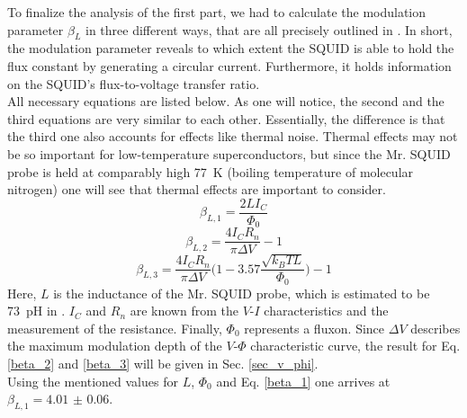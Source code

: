 \documentclass[a4paper,10pt]{article}
\begin{document}
To finalize the analysis of the first part, we had to calculate the modulation parameter $\beta_L$ in three different ways, that are all precisely outlined in \cite{skriptum}. In short, the modulation parameter reveals to which extent the SQUID is able to hold the flux constant by generating a circular current. Furthermore, it holds information on the SQUID's flux-to-voltage transfer ratio. 
\\
All necessary equations are listed below. As one will notice, the second and the third equations are very similar to each other. Essentially, the difference is that the third one also accounts for effects like thermal noise. Thermal effects may not be so important for low-temperature superconductors, but since the Mr. SQUID probe is held at comparably high \SI{77}{\kelvin} (boiling temperature of molecular nitrogen) one will see that thermal effects are important to consider. 
\begin{equation}
    \label{beta_1}
    \beta_{L,1} = \frac{2 L I_C}{\Phi_0}
\end{equation}
\begin{equation}
    \label{beta_2}
    \beta_{L,2} = \frac{4 I_C R_n}{\pi \Delta V} - 1
\end{equation}
\begin{equation}
    \label{beta_3}
    \beta_{L,3} = \frac{4 I_C R_n}{\pi \Delta V} \big( 1 - 3.57  \frac{\sqrt{k_B T L}}{\Phi_0} \big) - 1
\end{equation}
Here, $L$ is the inductance of the Mr. SQUID probe, which is estimated to be \SI{73}{\pico \henry} in \cite{skriptum}. $I_C$ and $R_n$ are known from the $V$-$I$ characteristics and the measurement of the resistance. Finally, $\Phi_0$ represents a fluxon. Since $\Delta V$ describes the maximum modulation depth of the $V$-$\Phi$ characteristic curve, the result for Eq. \ref{beta_2} and \ref{beta_3} will be given in Sec. \ref{sec_v_phi}. 
\\
Using the mentioned values for $L$, $\Phi_0$ and Eq. \ref{beta_1} one arrives at $\beta_{L,1} = \num{4.01(6)}$. 
\end{document}
